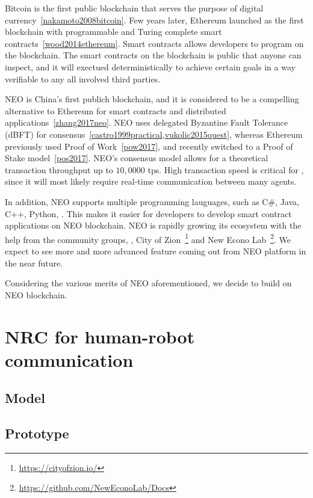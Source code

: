 \documentclass{article}
\begin{document}
Bitcoin is the first public blockchain that serves the purpose
of digital currency~\cref{nakamoto2008bitcoin}.
Few years later, Ethereum launched as the first blockchain with
programmable and Turing complete smart contracts~\cref{wood2014ethereum}.
Smart contracts allows developers to program on the blockchain.
The smart contracts on the blockchain is public that anyone
can inspect, and it will exectued deterministically to achieve
certain goals in a way verifiable to any all involved third
parties.

NEO is China's first publich blockchain, and it is considered to
be a compelling alternative to Ethereum for smart contracts and
distributed applications~\cref{zhang2017neo}.
NEO uses delegated Byzantine Fault Tolerance (dBFT) for 
consensus~\cref{castro1999practical,vukolic2015quest}, 
whereas Ethereum previously used Proof
of Work~\cref{pow2017}, and recently switched to a Proof of Stake
model~\cref{pos2017}.
NEO’s consensus model allows for 
a theoretical transaction throughput up to $10,0000$ tps.
High transaction speed is critical for \nrc, 
since it will most likely require 
real-time communication between many agents.


In addition, NEO supports multiple programming lauguages, such as C\#, Java,
C++, Python, \etc. This makes it easier for developers to develop
smart contract applications on NEO blockchain. 
NEO is rapidly growing its ecosystem with the help from the 
community groups, \eg, City of Zion~\footnote{\url{https://cityofzion.io/}} 
and New Econo Lab~\footnote{\url{https://github.com/NewEconoLab/Docs}}.
We expect to see more and more advanced feature coming out from NEO
platform in the near future.

Considering the various merits of NEO aforementioned, we decide to build
\nrc on NEO blockchain.


\section{NRC for human-robot communication}
\label{sec:nrc}

\subsection{Model}
\label{subsec:model}

\subsection{Prototype}
\label{subsec:prototype}
\end{document}
